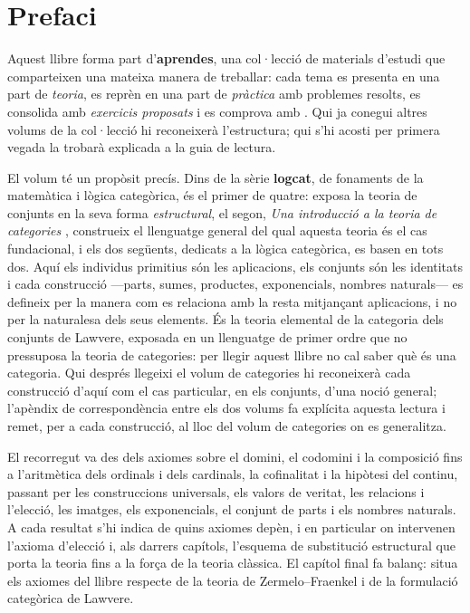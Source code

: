 \chapter*{Prefaci}

Aquest llibre forma part d'\textbf{aprendes}, una col·lecció de materials
d'estudi que comparteixen una mateixa manera de treballar: cada tema es
presenta en una part de \emph{teoria}, es reprèn en una part de
\emph{pràctica} amb problemes resolts, es consolida amb \emph{exercicis
proposats} i es comprova amb \emph{\nomtests}. Qui ja conegui
altres volums de la col·lecció hi reconeixerà l'estructura; qui s'hi
acosti per primera vegada la trobarà explicada a la guia de lectura.

El volum té un propòsit precís. Dins de la sèrie \textbf{logcat}, de
fonaments de la matemàtica i lògica categòrica, és el primer de quatre:
exposa la teoria de conjunts en la seva forma \emph{estructural}, el
segon, \emph{Una introducció a la teoria de categories}
\cite{perello-categories}, construeix el llenguatge general del qual
aquesta teoria és el cas fundacional, i els dos següents, dedicats a la
lògica categòrica, es basen en tots dos. Aquí els individus primitius
són les aplicacions, els conjunts són les identitats i cada construcció
---parts, sumes, productes, exponencials, nombres naturals--- es
defineix per la manera com es relaciona amb la resta mitjançant
aplicacions, i no per la naturalesa dels seus elements. És la teoria
elemental de la categoria dels conjunts de Lawvere, exposada en un
llenguatge de primer ordre que no pressuposa la teoria de categories:
per llegir aquest llibre no cal saber què és una categoria. Qui després
llegeixi el volum de categories hi reconeixerà cada construcció d'aquí
com el cas particular, en els conjunts, d'una noció general; l'apèndix
de correspondència entre els dos volums fa explícita aquesta lectura i
remet, per a cada construcció, al lloc del volum de categories on es
generalitza.

El recorregut va des dels axiomes sobre el domini, el codomini i la
composició fins a l'aritmètica dels ordinals i dels cardinals, la
cofinalitat i la hipòtesi del continu, passant per les construccions
universals, els valors de veritat, les relacions i l'elecció, les
imatges, els exponencials, el conjunt de parts i els nombres naturals.
A cada resultat s'hi indica de quins axiomes depèn, i en particular on
intervenen l'axioma d'elecció i, als darrers capítols, l'esquema de
substitució estructural que porta la teoria fins a la força de la teoria
clàssica. El capítol final fa balanç: situa els axiomes del llibre
respecte de la teoria de Zermelo--Fraenkel i de la formulació
categòrica de Lawvere.

